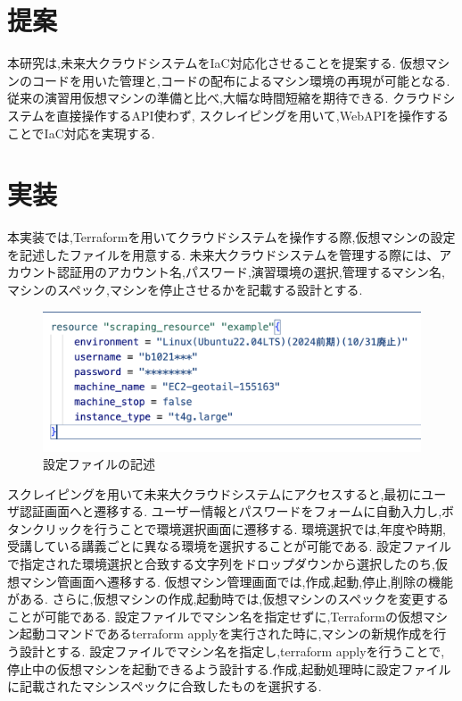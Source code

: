 \documentclass[11pt]{ujarticle}\sloppy
\begin{document}


\section{提案}


本研究は,未来大クラウドシステムをIaC対応化させることを提案する.
仮想マシンのコードを用いた管理と,コードの配布によるマシン環境の再現が可能となる.
従来の演習用仮想マシンの準備と比べ,大幅な時間短縮を期待できる.
クラウドシステムを直接操作するAPI使わず,
スクレイピングを用いて,WebAPIを操作することでIaC対応を実現する.


\section{実装}



本実装では,Terraformを用いてクラウドシステムを操作する際,仮想マシンの設定を記述したファイルを用意する.
未来大クラウドシステムを管理する際には、アカウント認証用のアカウント名,パスワード,演習環境の選択,管理するマシン名,マシンのスペック,マシンを停止させるかを記載する設計とする.


\begin{figure}[h]
	\includegraphics[width=1\linewidth]{./images/machine.png}
	\caption{設定ファイルの記述}
  \label{fig:machien}
\end{figure}


スクレイピングを用いて未来大クラウドシステムにアクセスすると,最初にユーザ認証画面へと遷移する.
ユーザー情報とパスワードをフォームに自動入力し,ボタンクリックを行うことで環境選択画面に遷移する.
環境選択では,年度や時期,受講している講義ごとに異なる環境を選択することが可能である.
設定ファイルで指定された環境選択と合致する文字列をドロップダウンから選択したのち,仮想マシン管画面へ遷移する.
仮想マシン管理画面では,作成,起動,停止,削除の機能がある.
さらに,仮想マシンの作成,起動時では,仮想マシンのスペックを変更することが可能である.
設定ファイルでマシン名を指定せずに,Terraformの仮想マシン起動コマンドであるterraform applyを実行された時に,マシンの新規作成を行う設計とする.
設定ファイルでマシン名を指定し,terraform applyを行うことで,停止中の仮想マシンを起動できるよう設計する.作成,起動処理時に設定ファイルに記載されたマシンスペックに合致したものを選択する.
\end{document}
